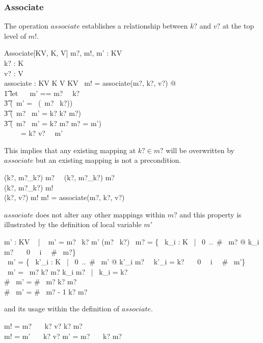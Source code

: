 \documentclass[../../main.tex]{subfiles}
\begin{document}
\subsubsection{Associate}
The operation $associate$ establishes a relationship between $k?$ and $v?$ at the top level of $m!$.
\begin{schema}{Associate[KV, K, V]}
  m?, m!, m' : KV \\
  k? : K \\
  v? : V \\
  associate : KV \cross K \cross V \bij KV\
  \where
  m! = associate(m?, k?, v?) @ \\
  \t1 let ~~ m' == m? ~\ndres ~k? \implies \\
  \t3 (\dom ~m' = \dom ~(~m? \setminus ~k?)) ~\land \\
  \t3 (~m? \setminus ~m' = k? \iff k? \in m?) ~\land \\
  \t3 (~m? \setminus ~m' = \emptyset \iff k? \not \in m? \implies m? = m')\\
   \ \ \ ~ = \ldata k? \mapsto v? \rdata ~\union ~m'
\end{schema}
This implies that any existing mapping at $k? \in m?$ will be overwritten by $associate$
but an existing mapping is not a precondition.
\begin{axdef}
  (k?, m?_{k?}) \in m? ~\lor ~(k?, m?_{k?}) \not \in m? \\
  (k?, m?_{k?}) \not \in m! \\
  (k?, v?) \in m!
  \where
  m! = associate(m?, k?, v?)
\end{axdef}
$associate$ does not alter any other mappings within $m?$ and this property is illustrated by the definition of local variable $m'$
\begin{axdef}
  m' : KV ~ | ~ m' = m? \ndres ~k? \implies m' \dres (m? \setminus ~k?)
  \where
  \dom ~m? = \{~ k_{i} : K ~|~ 0~..~\# ~m? @ k_{i} \in m? ~\land ~~0 ~\leq ~i ~\leq ~\# ~m?\} \\
  \dom ~m' = \{~ k'_{i} : K ~|~ 0~..~\# ~m' @ k'_{i} \in m? ~\land ~k'_{i} \not = k? ~\land ~~0 ~\leq ~i ~\leq ~\# ~m'\} \\
  \dom ~m' = \dom ~m? \iff k? \not \in m? \implies \forall k_{i} \in m? ~|~ k_{i} \not = k? \\
  \# ~m' = \# ~m? \iff k? \not \in m? \\
  \# ~m' = \# ~m? - 1 \iff k? \in m?
\end{axdef}
and its usage within the definition of $associate$.
\begin{zed}
  m! = m? ~\cup ~\ldata ~k? \mapsto v? \rdata \implies k? \not \in m? \\
  m! = m' ~\cup ~\ldata ~k? \mapsto v? \rdata \implies m' \not = m? ~\land ~~k? \in m?
\end{zed}
\end{document}
